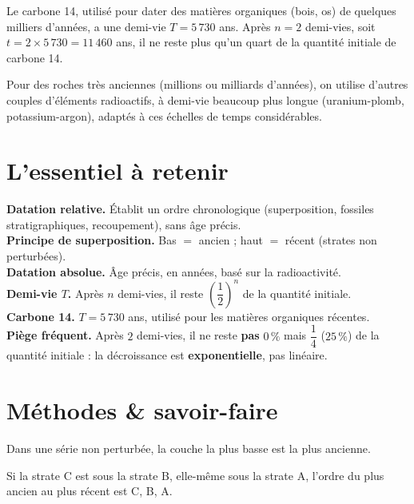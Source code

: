 \begin{exemple}
Le carbone 14, utilisé pour dater des matières organiques (bois, os) de quelques milliers
d'années, a une demi-vie $T=5\,730$ ans. Après $n=2$ demi-vies, soit
$t=2\times5\,730=11\,460$ ans, il ne reste plus qu'un quart de la quantité initiale de
carbone 14.
\end{exemple}

\begin{remarque}
Pour des roches très anciennes (millions ou milliards d'années), on utilise d'autres
couples d'éléments radioactifs, à demi-vie beaucoup plus longue (uranium-plomb,
potassium-argon), adaptés à ces échelles de temps considérables.
\end{remarque}

\section{L'essentiel à retenir}

\begin{synthese}
\textbf{Datation relative.} Établit un ordre chronologique (superposition, fossiles
stratigraphiques, recoupement), sans âge précis.\\[4pt]
\textbf{Principe de superposition.} Bas $=$ ancien ; haut $=$ récent (strates non
perturbées).\\[4pt]
\textbf{Datation absolue.} Âge précis, en années, basé sur la radioactivité.\\[4pt]
\textbf{Demi-vie $T$.} Après $n$ demi-vies, il reste $\left(\dfrac12\right)^n$ de la
quantité initiale.\\[4pt]
\textbf{Carbone 14.} $T=5\,730$ ans, utilisé pour les matières organiques récentes.\\[4pt]
\textbf{Piège fréquent.} Après $2$ demi-vies, il ne reste \textbf{pas} $0\,\%$ mais
$\dfrac14$ ($25\,\%$) de la quantité initiale : la décroissance est
\textbf{exponentielle}, pas linéaire.
\end{synthese}

\section{Méthodes \& savoir-faire}

Dans une série non perturbée, la couche la plus basse est la plus ancienne.
\begin{exemple}
Si la strate C est sous la strate B, elle-même sous la strate A, l'ordre du plus ancien
au plus récent est C, B, A.
\end{exemple}

